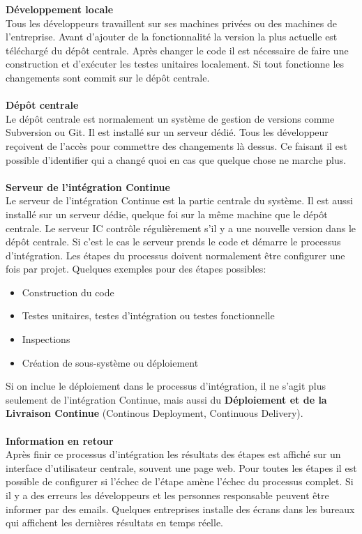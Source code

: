 \textbf{Développement locale}\\
Tous les développeurs travaillent sur ses machines privées ou des machines de l'entreprise. Avant d'ajouter de la fonctionnalité la version la plus actuelle est téléchargé du dépôt centrale. Après changer le code il est nécessaire de faire une construction et d'exécuter les testes unitaires localement. Si tout fonctionne les changements sont commit sur le dépôt centrale.\\\\
\textbf{Dépôt centrale}\\
Le dépôt centrale est normalement un système de gestion de versions comme Subversion ou Git. Il est installé sur un serveur dédié. Tous les développeur reçoivent de l'accès pour commettre des changements là dessus. Ce faisant il est possible d'identifier qui a changé quoi en cas que quelque chose ne marche plus.\\\\
\textbf{Serveur de l'intégration Continue} \\
Le serveur de l'intégration Continue est la partie centrale du système. Il est aussi installé sur un serveur dédie, quelque foi sur la même machine que le dépôt centrale. Le serveur IC contrôle régulièrement s'il y a une nouvelle version dans le dépôt centrale. Si c'est le cas le serveur prends le code et démarre le processus d'intégration. Les étapes du processus doivent normalement être configurer une fois par projet. Quelques exemples pour des étapes possibles:
\begin{itemize}
\item Construction du code
\item Testes unitaires, testes d'intégration ou testes fonctionnelle
\item Inspections
\item Création de sous-système ou déploiement
\end{itemize}
Si on inclue le déploiement dans le processus d'intégration, il ne s'agit plus seulement de l'intégration Continue, mais aussi du \textbf{Déploiement et de la Livraison Continue} (Continous Deployment, Continuous Delivery). 
\\\\
\textbf{Information en retour}\\
Après finir ce processus d'intégration les résultats des étapes est affiché sur un interface d'utilisateur centrale, souvent une page web. Pour toutes les étapes il est possible de configurer si l'échec de l'étape amène l'échec du processus complet. Si il y a des erreurs les développeurs et les personnes responsable peuvent être informer par des emails. Quelques entreprises installe des écrans dans les bureaux qui affichent les dernières résultats en temps réelle.\\

